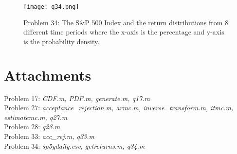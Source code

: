 \documentclass[a4paper, 11pt]{article}
\begin{document}
\begin{figure}
		\texttt{[image: q34.png]}
		\caption{Problem 34: The S\&P 500 Index and the return distributions from 8 different time periods where the x-axis is the percentage and y-axis is the probability density. }
\end{figure}

\section*{Attachments}
	Problem 17: \textit{CDF.m, PDF.m, generate.m, q17.m} \\
	Problem 27: \textit{acceptance\_rejection.m, armc.m, inverse\_transform.m, itmc.m, estimatemc.m, q27.m}\\
	Problem 28: \textit{q28.m}\\
	Problem 33: \textit{acc\_rej.m, q33.m}\\
	Problem 34: \textit{sp5ydaily.csv, getreturns.m, q34.m}\\

\end{document}
